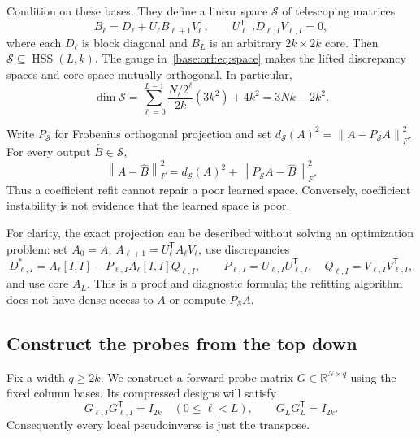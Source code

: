 \documentclass[11pt,oneside,openany,a4paper]{book}
\numberwithin{equation}{chapter}
\theoremstyle{definition}
\theoremstyle{remark}
\newcommand{\R}{\mathbb R}\newcommand{\E}{\mathbb E}\newcommand{\Prb}{\mathbb P}\newcommand{\PP}{\mathbb P}
\newcommand{\T}{\mathsf T}\newcommand{\Id}{I}
\newcommand{\F}[1]{\left\lVert#1\right\rVert_F}
\DeclareMathOperator{\HSS}{HSS}\DeclareMathOperator{\dist}{dist}
\begin{document}
Condition on these bases. They define a linear space $\mathcal S$ of
telescoping matrices
\begin{equation}\label{base:orf:eq:space}
 B_\ell=D_\ell+U_\ell B_{\ell+1}V_\ell^{\T},\qquad
 U_{\ell,I}^{\T}D_{\ell,I}V_{\ell,I}=0,
\end{equation}
where each $D_\ell$ is block diagonal and $B_L$ is an arbitrary
$2k\times2k$ core. Then $\mathcal S\subseteq\HSS(L,k)$.
The gauge in~\eqref{base:orf:eq:space} makes the lifted discrepancy spaces and core
space mutually orthogonal. In particular,
\begin{equation}\label{base:orf:eq:dimension}
 \dim\mathcal S
 =\sum_{\ell=0}^{L-1}\frac{N/2^\ell}{2k}(3k^2)+4k^2
 =3Nk-2k^2.
\end{equation}

Write $P_{\mathcal S}$ for Frobenius orthogonal projection and set
$d_{\mathcal S}(A)^2=\F{A-P_{\mathcal S}A}^2$. For every output
$\widehat B\in\mathcal S$,
\begin{equation}\label{base:orf:eq:split}
 \F{A-\widehat B}^2
 =d_{\mathcal S}(A)^2+\F{P_{\mathcal S}A-\widehat B}^2.
\end{equation}
Thus a coefficient refit cannot repair a poor learned space. Conversely,
coefficient instability is not evidence that the learned space is poor.

For clarity, the exact projection can be described without solving an
optimization problem: set $A_0=A$, $A_{\ell+1}=U_\ell^{\T}A_\ell V_\ell$,
use discrepancies
\[
 D_{\ell,I}^{*}=A_\ell[I,I]
   -P_{\ell,I}A_\ell[I,I]Q_{\ell,I},\qquad
 P_{\ell,I}=U_{\ell,I}U_{\ell,I}^{\T},\quad
 Q_{\ell,I}=V_{\ell,I}V_{\ell,I}^{\T},
\]
and use core $A_L$. This is a proof and diagnostic formula; the refitting
algorithm does not have dense access to $A$ or compute $P_{\mathcal S}A$.

\subsection{Construct the probes from the top down}
Fix a width $q\ge2k$. We construct a forward probe matrix $G\in\R^{N\times q}$
using the fixed column bases. Its compressed designs will satisfy
\begin{equation}\label{base:orf:eq:frames}
 G_{\ell,I}G_{\ell,I}^{\T}=I_{2k}\quad(0\le\ell<L),\qquad
 G_LG_L^{\T}=I_{2k}.
\end{equation}
Consequently every local pseudoinverse is just the transpose.
\end{document}
